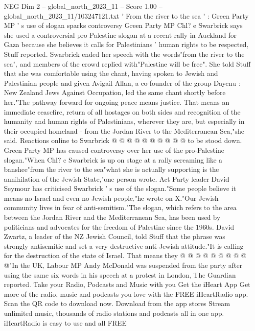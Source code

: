 \begin{textsample}{NEG Dim 2 – global\_north\_2023\_11 – Score 1.00 – global\_north\_2023\_11/103247121.txt}  \label{ex:f2_neg_216}
' From the river to the sea ' : Green Party MP ' s use of slogan sparks controversy Green Party MP Chl? e Swarbrick says she used a controversial pro-Palestine slogan at a recent rally in Auckland for Gaza because she believes it calls for Palestinians ' human rights to be respected, Stuff reported.
Swarbrick ended her speech with the words"from the river to the sea", and members of the crowd replied with"Palestine will be free".
She told Stuff that she was comfortable using the chant, having spoken to Jewish and Palestinian people and given Avigail Allan, a co-founder of the group Dayenu : New Zealand Jews Against Occupation, led the same chant shortly before her."The pathway forward for ongoing peace means justice.
That means an immediate ceasefire, return of all hostages on both sides and recognition of the humanity and human rights of Palestinians, wherever they are, but especially in their occupied homeland - from the Jordan River to the Mediterranean Sea,"she said.
Reactions online to Swarbrick @ @ @ @ @ @ @ @ @ @ to be stood down.
Green Party MP has caused controversy over her use of the pro-Palestine slogan."When Chl? e Swarbrick is up on stage at a rally screaming like a banshee"from the river to the sea"what she is actually supporting is the annihilation of the Jewish State,"one person wrote.
Act Party leader David Seymour has criticised Swarbrick ' s use of the slogan."Some people believe it means no Israel and even no Jewish people,"he wrote on X."Our Jewish community lives in fear of anti-semitism."The slogan, which refers to the area between the Jordan River and the Mediterranean Sea, has been used by politicians and advocates for the freedom of Palestine since the 1960s.
David Zwartz, a leader of the NZ Jewish Council, told Stuff that the phrase was strongly antisemitic and set a very destructive anti-Jewish attitude."It is calling for the destruction of the state of Israel.
That means they @ @ @ @ @ @ @ @ @ @"In the UK, Labour MP Andy McDonald was suspended from the party after using the same six words in his speech at a protest in London, The Guardian reported.
Take your Radio, Podcasts and Music with you Get the iHeart App Get more of the radio, music and podcasts you love with the FREE iHeartRadio app.
Scan the QR code to download now.
Download from the app stores Stream unlimited music, thousands of radio stations and podcasts all in one app. iHeartRadio is easy to use and all FREE

\end{textsample}
